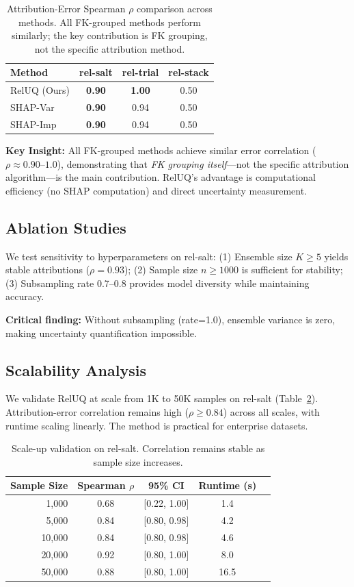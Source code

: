 \documentclass{article}
\begin{document}
\begin{table}[t]
\centering
\caption{Attribution-Error Spearman $\rho$ comparison across methods. All FK-grouped methods
perform similarly; the key contribution is FK grouping, not the specific attribution method.}
\label{tab:baseline}
\begin{tabular}{lccc}
\toprule
Method & rel-salt & rel-trial & rel-stack \\
\midrule
RelUQ (Ours) & \textbf{0.90} & \textbf{1.00} & 0.50 \\
SHAP-Var & \textbf{0.90} & 0.94 & 0.50 \\
SHAP-Imp & \textbf{0.90} & 0.94 & 0.50 \\
\bottomrule
\end{tabular}
\end{table}

\textbf{Key Insight:} All FK-grouped methods achieve similar error correlation ($\rho \approx 0.90$--$1.0$),
demonstrating that \emph{FK grouping itself}---not the specific attribution algorithm---is the
main contribution. RelUQ's advantage is computational efficiency (no SHAP computation) and
direct uncertainty measurement.

\subsection{Ablation Studies}

We test sensitivity to hyperparameters on rel-salt:
(1) Ensemble size $K \geq 5$ yields stable attributions ($\rho = 0.93$);
(2) Sample size $n \geq 1000$ is sufficient for stability;
(3) Subsampling rate 0.7--0.8 provides model diversity while maintaining accuracy.

\textbf{Critical finding:} Without subsampling (rate=1.0), ensemble variance is zero,
making uncertainty quantification impossible.

\subsection{Scalability Analysis}

We validate RelUQ at scale from 1K to 50K samples on rel-salt (Table~\ref{tab:scale}).
Attribution-error correlation remains high ($\rho \geq 0.84$) across all scales,
with runtime scaling linearly. The method is practical for enterprise datasets.

\begin{table}[t]
\centering
\caption{Scale-up validation on rel-salt. Correlation remains stable as sample size increases.}
\label{tab:scale}
\begin{tabular}{rcccc}
\toprule
Sample Size & Spearman $\rho$ & 95\% CI & Runtime (s) \\
\midrule
1,000 & 0.68 & [0.22, 1.00] & 1.4 \\
5,000 & 0.84 & [0.80, 0.98] & 4.2 \\
10,000 & 0.84 & [0.80, 0.98] & 4.6 \\
20,000 & 0.92 & [0.80, 1.00] & 8.0 \\
50,000 & 0.88 & [0.80, 1.00] & 16.5 \\
\bottomrule
\end{tabular}
\end{table}
\end{document}
